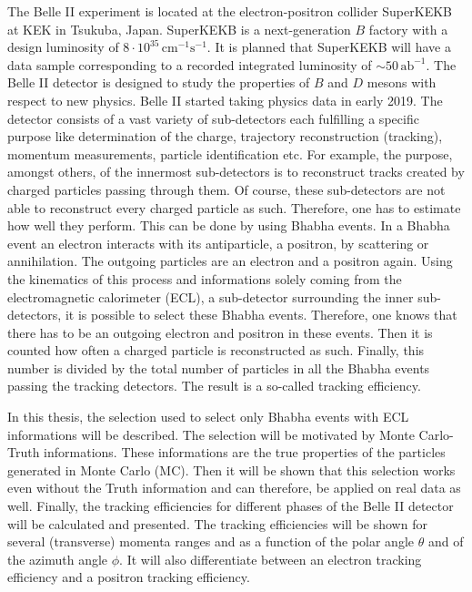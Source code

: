 \documentclass[a4paper,11pt,twosided,final,german,openbib,pdftex,listof=totoc,bibliography=totoc]{scrbook}
\begin{document}
The Belle II experiment is located at the electron-positron collider SuperKEKB at KEK in Tsukuba, Japan. SuperKEKB is a next-generation $B$ factory with a design luminosity of $8\cdot 10^{35}\,\textrm{cm}^{-1}\textrm{s}^{-1}$. It is planned that SuperKEKB will have a data sample corresponding to a recorded integrated luminosity of $\sim 50\,\textrm{ab}^{-1}$. 
The Belle II detector is designed to study the properties of $B$ and $D$ mesons with respect to new physics. Belle II started taking physics data in early 2019. 
The detector consists of a vast variety of sub-detectors each fulfilling a specific purpose like determination of the charge, trajectory reconstruction (tracking), momentum measurements, particle identification etc. For example, the purpose, amongst others, of the innermost sub-detectors is to reconstruct tracks created by charged particles passing through them. Of course, these sub-detectors are not able to reconstruct every charged particle as such. Therefore, one has to estimate how well they perform. This can be done by using Bhabha events. 
In a Bhabha event an electron interacts with its antiparticle, a positron, by scattering or annihilation. The outgoing particles are an electron and a positron again. Using the kinematics of this process and informations solely coming from the electromagnetic calorimeter (ECL), a sub-detector surrounding the inner sub-detectors, it is possible to select these Bhabha events. Therefore, one knows that there has to be an outgoing electron and positron in these events. Then it is counted how often a charged particle is reconstructed as such. Finally, this number is divided by the total number of particles in all the Bhabha events passing the tracking detectors. The result is a so-called tracking efficiency.
\newline


In this thesis, the selection used to select only Bhabha events with ECL informations will be described. The selection will be motivated by Monte Carlo-Truth informations. These informations are the true properties of the particles generated in Monte Carlo (MC). Then it will be shown that this selection works even without the Truth information and can therefore, be applied on real data as well. Finally, the tracking efficiencies for different phases of the Belle II detector will be calculated and presented. The tracking efficiencies will be shown for several (transverse) momenta ranges and as a function of the polar angle $\theta$ and of the azimuth angle $\phi$. It will also differentiate between an electron tracking efficiency and a positron tracking efficiency.
\newline
\end{document}
